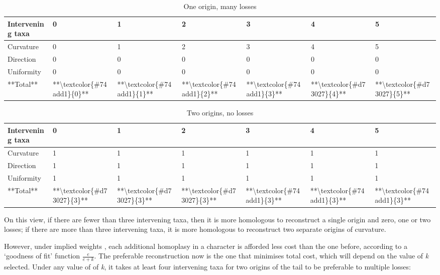 \documentclass[]{book}
\theoremstyle{definition}
\theoremstyle{definition}
\theoremstyle{definition}
\theoremstyle{remark}
\begin{document}
\begin{table}

\caption{\label{tab:iw-delaet-ew-a}One origin, many losses}
\centering
\begin{tabular}[t]{l|l|l|l|l|l|l}
\hline
Intervening taxa & 0 & 1 & 2 & 3 & 4 & 5\\
\hline
Curvature & 0 & 1 & 2 & 3 & 4 & 5\\
\hline
Direction & 0 & 0 & 0 & 0 & 0 & 0\\
\hline
Uniformity & 0 & 0 & 0 & 0 & 0 & 0\\
\hline
**Total** & **\textbackslash{}textcolor\{\#74add1\}\{0\}** & **\textbackslash{}textcolor\{\#74add1\}\{1\}** & **\textbackslash{}textcolor\{\#74add1\}\{2\}** & **\textbackslash{}textcolor\{\#74add1\}\{3\}** & **\textbackslash{}textcolor\{\#d73027\}\{4\}** & **\textbackslash{}textcolor\{\#d73027\}\{5\}**\\
\hline
\end{tabular}
\end{table}

\begin{table}

\caption{\label{tab:iw-delaet-ew-b}Two origins, no losses}
\centering
\begin{tabular}[t]{l|l|l|l|l|l|l}
\hline
Intervening taxa & 0 & 1 & 2 & 3 & 4 & 5\\
\hline
Curvature & 1 & 1 & 1 & 1 & 1 & 1\\
\hline
Direction & 1 & 1 & 1 & 1 & 1 & 1\\
\hline
Uniformity & 1 & 1 & 1 & 1 & 1 & 1\\
\hline
**Total** & **\textbackslash{}textcolor\{\#d73027\}\{3\}** & **\textbackslash{}textcolor\{\#d73027\}\{3\}** & **\textbackslash{}textcolor\{\#d73027\}\{3\}** & **\textbackslash{}textcolor\{\#74add1\}\{3\}** & **\textbackslash{}textcolor\{\#74add1\}\{3\}** & **\textbackslash{}textcolor\{\#74add1\}\{3\}**\\
\hline
\end{tabular}
\end{table}

On this view, if there are fewer than three intervening taxa, then it is
more homologous to reconstruct a single origin and zero, one or two
losses; if there are more than three intervening taxa, it is more
homologous to reconstruct two separate origins of curvature.

However, under implied weights \citep{Goloboff1993}, each additional
homoplasy in a character is afforded less cost than the one before,
according to a `goodness of fit' function \(\frac{e}{e + k}\). The
preferable reconstruction now is the one that minimises total cost,
which will depend on the value of \emph{k} selected. Under any value of
of \emph{k}, it takes at least four intervening taxa for two origins of
the tail to be preferable to multiple losses:
\end{document}
